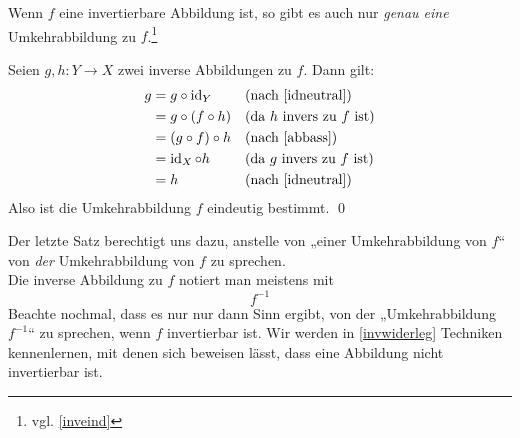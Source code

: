 \begin{sat}\label{umkehreind}
Wenn $f$ eine invertierbare Abbildung ist, so gibt es auch nur \emph{genau eine} Umkehrabbildung zu $f$.\footnote{vgl. \cref{inveind}}
\end{sat}
\begin{bew}
 Seien $g,h:Y\to X$ zwei inverse Abbildungen zu $f$. Dann gilt:
 \begin{align*}
  g & = g\circ \iden_Y && (\text{nach \cref{idneutral}})\\
  & = g\circ (f\circ h) && (\text{da $h$ invers zu $f$ ist}) \\
  & = (g\circ f)\circ h && (\text{nach \cref{abbass}}) \\
  & = \iden_X \circ h && (\text{da $g$ invers zu $f$ ist}) \\
  & = h && (\text{nach \cref{idneutral}}) 
 \end{align*}
Also ist die Umkehrabbildung $f$ eindeutig bestimmt. \qed
\end{bew}


\begin{bem}
Der letzte Satz berechtigt uns dazu, anstelle von „einer Umkehrabbildung von $f$“ von \emph{der} Umkehrabbildung von $f$ zu sprechen. \\
Die inverse Abbildung zu $f$ notiert man meistens mit
\[ f^{-1} \]
Beachte nochmal, dass es nur nur dann Sinn ergibt, von der „Umkehrabbildung $f^{-1}$“ zu sprechen, wenn $f$ invertierbar ist. Wir werden in \cref{invwiderleg} Techniken kennenlernen, mit denen sich beweisen lässt, dass eine Abbildung nicht invertierbar ist.
\end{bem}

